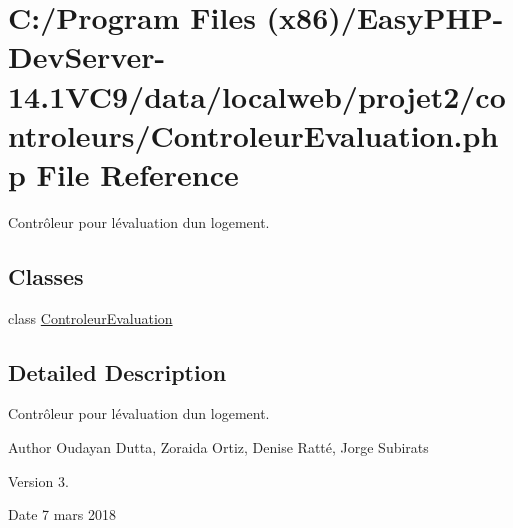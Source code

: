 \hypertarget{_controleur_evaluation_8php}{}\section{C\+:/\+Program Files (x86)/\+Easy\+P\+H\+P-\/\+Dev\+Server-\/14.1\+V\+C9/data/localweb/projet2/controleurs/\+Controleur\+Evaluation.php File Reference}
\label{_controleur_evaluation_8php}


Contrôleur pour l\textquotesingle{}évaluation d\textquotesingle{}un logement.  


\subsection*{Classes}
\begin{DoxyCompactItemize}
\item 
class \hyperlink{class_controleur_evaluation}{Controleur\+Evaluation}
\end{DoxyCompactItemize}


\subsection{Detailed Description}
Contrôleur pour l\textquotesingle{}évaluation d\textquotesingle{}un logement. 

\begin{DoxyAuthor}{Author}
Oudayan Dutta, Zoraida Ortiz, Denise Ratté, Jorge Subirats 
\end{DoxyAuthor}
\begin{DoxyVersion}{Version}
3. 
\end{DoxyVersion}
\begin{DoxyDate}{Date}
7 mars 2018 
\end{DoxyDate}
